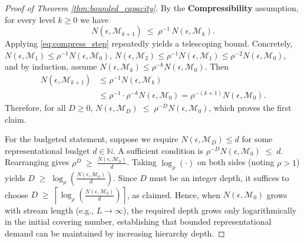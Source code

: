 \documentclass{article}
\begin{document}
\begin{proof}[Proof of Theorem \ref{thm:bounded_capacity}]
By the \textbf{Compressibility} assumption, for every level $k\ge 0$ we have
\begin{equation}
\label{eq:compress_step}
N(\epsilon,\mathcal M_{k+1}) \;\le\; \rho^{-1}\, N(\epsilon,\mathcal M_k).
\end{equation}
Applying \eqref{eq:compress_step} repeatedly yields a telescoping bound. Concretely,
$N(\epsilon,\mathcal M_{1}) \le \rho^{-1} N(\epsilon,\mathcal M_0)$,
$N(\epsilon,\mathcal M_{2}) \le \rho^{-1} N(\epsilon,\mathcal M_1)\le \rho^{-2} N(\epsilon,\mathcal M_0)$,
and by induction, assume $N(\epsilon,\mathcal M_{k}) \le \rho^{-k} N(\epsilon,\mathcal M_0)$. Then
\begin{equation}
\begin{aligned}
N(\epsilon,\mathcal M_{k+1})
&\le \rho^{-1} N(\epsilon,\mathcal M_k) \\
&\le \rho^{-1}\cdot \rho^{-k} N(\epsilon,\mathcal M_0)
= \rho^{-(k+1)} N(\epsilon,\mathcal M_0).
\end{aligned}
\end{equation}
Therefore, for all $D\ge 0$,
$N(\epsilon,\mathcal M_D) \;\le\; \rho^{-D} N(\epsilon,\mathcal M_0)$,
which proves the first claim.
 
For the budgeted statement, suppose we require $N(\epsilon,\mathcal M_D)\le d$ for some representational budget $d\in\mathbb N$.
A sufficient condition is
$\rho^{-D} N(\epsilon,\mathcal M_0) \;\le\; d$.
Rearranging gives
$\rho^D \;\ge\; \frac{N(\epsilon,\mathcal M_0)}{d}$.
Taking $\log_\rho(\cdot)$ on both sides (noting $\rho>1$) yields
$D \;\ge\; \log_{\rho}\!\left(\frac{N(\epsilon,\mathcal M_0)}{d}\right)$.
Since $D$ must be an integer depth, it suffices to choose
$D \;\ge\; \left\lceil \log_{\rho}\!\left(\frac{N(\epsilon,\mathcal M_0)}{d}\right)\right\rceil$,
as claimed. Hence, when $N(\epsilon,\mathcal M_0)$ grows with stream length (e.g., $L\to\infty$),
the required depth grows only logarithmically in the initial covering number, establishing that bounded representational demand can be maintained by increasing hierarchy depth.
\end{proof}
 
\end{document}
